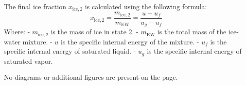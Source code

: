 The final ice fraction \( x_{\text{ice},2} \) is calculated using the following formula:  
\[
x_{\text{ice},2} = \frac{m_{\text{ice},2}}{m_{\text{EW}}} = \frac{u - u_f}{u_g - u_f}
\]  
Where:  
- \( m_{\text{ice},2} \) is the mass of ice in state 2.  
- \( m_{\text{EW}} \) is the total mass of the ice-water mixture.  
- \( u \) is the specific internal energy of the mixture.  
- \( u_f \) is the specific internal energy of saturated liquid.  
- \( u_g \) is the specific internal energy of saturated vapor.  

No diagrams or additional figures are present on the page.